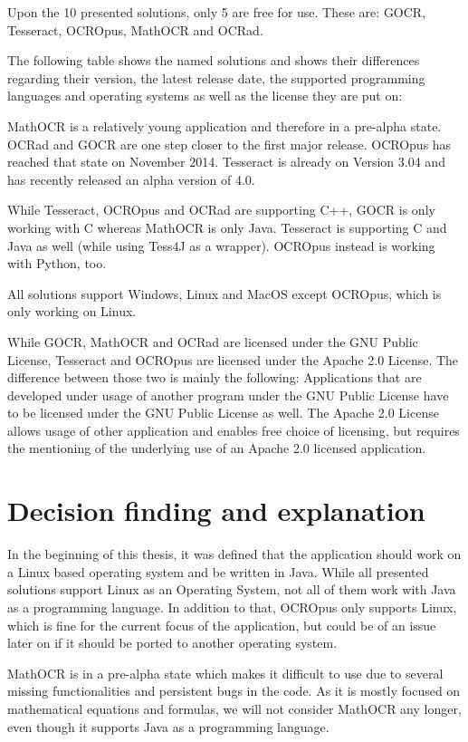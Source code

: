 Upon the 10 presented solutions, only 5 are free for use. These are: GOCR, Tesseract, OCROpus, MathOCR and OCRad.

The following table shows the named solutions and shows their differences regarding their version, the latest release date, the supported programming languages and operating systems as well as the license they are put on:


MathOCR is a relatively young application and therefore in a pre-alpha state. OCRad and GOCR are one step closer to the first major release. OCROpus has reached that state on November 2014. Tesseract is already on Version 3.04 and has recently released an alpha version of 4.0.

While Tesseract, OCROpus and OCRad are supporting C++, GOCR is only working with C whereas MathOCR is only Java. Tesseract is supporting C and Java as well (while using Tess4J as a wrapper). OCROpus instead is working with Python, too.

All solutions support Windows, Linux and MacOS except OCROpus, which is only working on Linux.

While GOCR, MathOCR and OCRad are licensed under the GNU Public License, Tesseract and OCROpus are licensed under the Apache 2.0 License. The difference between those two is mainly the following: Applications that are developed under usage of another program under the GNU Public License have to be licensed under the GNU Public License as well. The Apache 2.0 License allows usage of other application and enables free choice of licensing, but requires the mentioning of the underlying use of an Apache 2.0 licensed application.


\label{OCRDecision}
\section{Decision finding and explanation}
In the beginning of this thesis, it was defined that the application should work on a Linux based operating system and be written in Java. While all presented solutions support Linux as an Operating System, not all of them work with Java as a programming language. In addition to that, OCROpus only supports Linux, which is fine for the current focus of the application, but could be of an issue later on if it should be ported to another operating system.

MathOCR is in a pre-alpha state which makes it difficult to use due to several missing functionalities and persistent bugs in the code. As it is mostly focused on mathematical equations and formulas, we will not consider MathOCR any longer, even though it supports Java as a programming language. 

